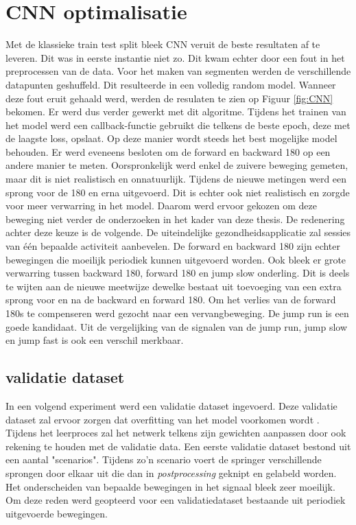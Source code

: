 \section{CNN optimalisatie}
Met de klassieke train test split bleek CNN veruit de beste resultaten af te leveren. Dit was in eerste instantie niet zo. Dit kwam echter door een fout in het preprocessen van de data. Voor het maken van segmenten werden de verschillende datapunten geshuffeld. Dit resulteerde in een volledig random model. Wanneer deze fout eruit gehaald werd, werden de resulaten te zien op Figuur \ref{fig:CNN} bekomen. Er werd dus verder gewerkt met dit algoritme. 
Tijdens het trainen van het model werd een callback-functie gebruikt die telkens de beste epoch, deze met de laagste loss, opslaat. Op deze manier wordt steeds het best mogelijke model behouden.
Er werd eveneens besloten om de forward en backward 180 op een andere manier te meten. Oorspronkelijk werd enkel de zuivere beweging gemeten, maar dit is niet realistisch en onnatuurlijk. Tijdens de nieuwe metingen werd een sprong voor de 180 en erna uitgevoerd. Dit is echter ook niet realistisch en zorgde voor meer verwarring in het model. Daarom werd ervoor gekozen om deze beweging niet verder de onderzoeken in het kader van deze thesis.
De redenering achter deze keuze is de volgende. De uiteindelijke gezondheidsapplicatie zal sessies van één bepaalde activiteit aanbevelen. De forward en backward 180 zijn echter bewegingen die moeilijk periodiek kunnen uitgevoerd worden. Ook bleek er grote verwarring tussen backward 180, forward 180 en jump slow onderling. Dit is deels te wijten aan de nieuwe meetwijze dewelke bestaat uit toevoeging van een extra sprong voor en na de backward en forward 180. 
Om het verlies van de forward 180s te compenseren werd gezocht naar een vervangbeweging. De jump run is een goede kandidaat. Uit de vergelijking van de signalen van de jump run, jump slow en jump fast is ook een verschil merkbaar. 

\subsection{validatie dataset}
In een volgend experiment werd een validatie dataset ingevoerd. Deze validatie dataset zal ervoor zorgen dat overfitting van het model voorkomen wordt \cite{ref81}. Tijdens het leerproces zal het netwerk telkens zijn gewichten aanpassen door ook rekening te houden met de validatie data.
Een eerste validatie dataset bestond uit een aantal "scenarios". Tijdens zo'n scenario voert de springer verschillende sprongen door elkaar uit die dan in \textit{postprocessing} geknipt en gelabeld worden.
Het onderscheiden van bepaalde bewegingen in het signaal bleek zeer moeilijk. Om deze reden werd geopteerd voor een validatiedataset bestaande uit periodiek uitgevoerde bewegingen.

